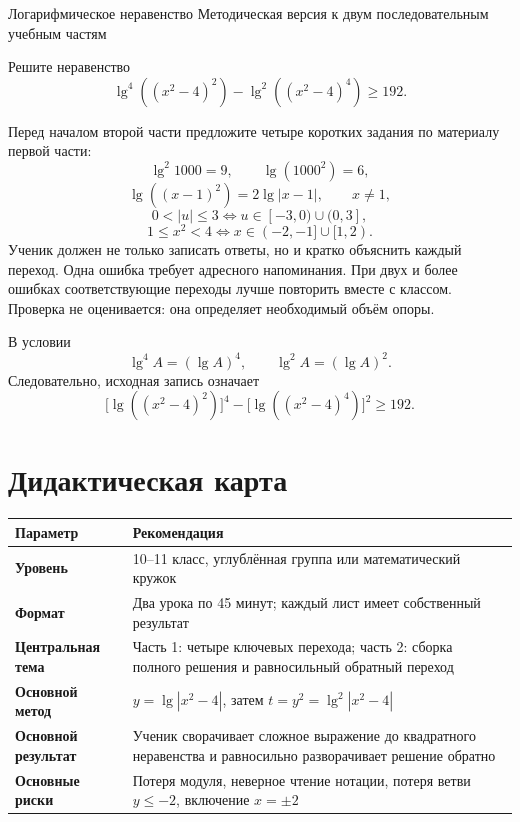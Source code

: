 \worksheettitle
  {Логарифмическое неравенство}
  {Методическая версия к двум последовательным учебным частям}

\begin{problembox}
  Решите неравенство
  \[
    \lg^4((x^2-4)^2)-\lg^2((x^2-4)^4)\ge192.
  \]
\end{problembox}

\begin{teacherbox}
  Перед началом второй части предложите четыре коротких задания по материалу
  первой части:
  \[
    \lg^2 1000=9,
    \qquad
    \lg(1000^2)=6,
  \]
  \[
    \lg((x-1)^2)=2\lg|x-1|,
    \qquad x\ne1,
  \]
  \[
    0<|u|\le3
    \Longleftrightarrow
    u\in[-3,0)\cup(0,3],
  \]
  \[
    1\le x^2<4
    \Longleftrightarrow
    x\in(-2,-1]\cup[1,2).
  \]
  Ученик должен не только записать ответы, но и кратко объяснить каждый
  переход. Одна ошибка требует адресного напоминания. При двух и более
  ошибках соответствующие переходы лучше повторить вместе с классом.
  Проверка не оценивается: она определяет необходимый объём опоры.
\end{teacherbox}

\begin{notebox}
  В условии
  \[
    \lg^4 A=(\lg A)^4,
    \qquad
    \lg^2 A=(\lg A)^2.
  \]
  Следовательно, исходная запись означает
  \[
    \bigl[\lg((x^2-4)^2)\bigr]^4
    -\bigl[\lg((x^2-4)^4)\bigr]^2\ge192.
  \]
\end{notebox}

\section{Дидактическая карта}

\begin{center}
  \renewcommand{\arraystretch}{1.5}
  \begin{tabularx}{\textwidth}{@{}
    >{\bfseries\sffamily}p{}X@{}}
    \toprule
    \rowcolor{TableHeader}
    Параметр & Рекомендация \\
    \midrule
    Уровень & 10--11 класс, углублённая группа или математический кружок \\
    Формат & Два урока по 45 минут; каждый лист имеет собственный результат \\
    Центральная тема & Часть 1: четыре ключевых перехода; часть 2: сборка полного решения и равносильный обратный переход \\
    Основной метод & \(y=\lg|x^2-4|\), затем \(t=y^2=\lg^2|x^2-4|\) \\
    Основной результат & Ученик сворачивает сложное выражение до квадратного неравенства и равносильно разворачивает решение обратно \\
    Основные риски & Потеря модуля, неверное чтение нотации, потеря ветви \(y\le-2\), включение \(x=\pm2\) \\
    \bottomrule
  \end{tabularx}
\end{center}

